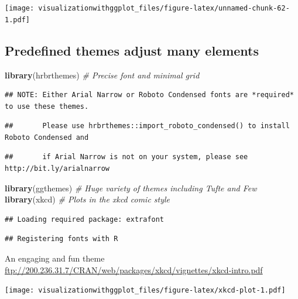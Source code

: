 \documentclass[]{krantz}
\makeatletter
\newenvironment{Shaded}{\begin{snugshade}}{\end{snugshade}}
\newcommand{\KeywordTok}[1]{\textcolor[rgb]{0.13,0.29,0.53}{\textbf{#1}}}
\newcommand{\CommentTok}[1]{\textcolor[rgb]{0.56,0.35,0.01}{\textit{#1}}}
\newcommand{\NormalTok}[1]{#1}
\newenvironment{kframe}{%
\medskip{}
\setlength{\fboxsep}{.8em}
 \def\at@end@of@kframe{}%
 \ifinner\ifhmode%
  \def\at@end@of@kframe{\end{minipage}}%
  \begin{minipage}{\columnwidth}%
 \fi\fi%
 \def\FrameCommand##1{\hskip\@totalleftmargin \hskip-\fboxsep
 \colorbox{shadecolor}{##1}\hskip-\fboxsep
     \hskip-\linewidth \hskip-\@totalleftmargin \hskip\columnwidth}%
 \MakeFramed {\advance\hsize-\width
   \@totalleftmargin\z@ \linewidth\hsize
   \@setminipage}}%
 {\par\unskip\endMakeFramed%
 \at@end@of@kframe}
\renewenvironment{Shaded}{\begin{kframe}}{\end{kframe}}
\theoremstyle{definition}
\theoremstyle{definition}
\theoremstyle{definition}
\theoremstyle{remark}
\makeatother
\begin{document}
\texttt{[image: visualizationwithggplot\_files/figure-latex/unnamed-chunk-62-1.pdf]}

\subsection{Predefined themes adjust many
elements}\label{predefined-themes-adjust-many-elements}

\begin{Shaded}
\begin{Highlighting}[]
\KeywordTok{library}\NormalTok{(hrbrthemes) }\CommentTok{# Precise font and minimal grid}
\end{Highlighting}
\end{Shaded}

\begin{verbatim}
## NOTE: Either Arial Narrow or Roboto Condensed fonts are *required* to use these themes.
\end{verbatim}

\begin{verbatim}
##       Please use hrbrthemes::import_roboto_condensed() to install Roboto Condensed and
\end{verbatim}

\begin{verbatim}
##       if Arial Narrow is not on your system, please see http://bit.ly/arialnarrow
\end{verbatim}

\begin{Shaded}
\begin{Highlighting}[]
\KeywordTok{library}\NormalTok{(ggthemes) }\CommentTok{# Huge variety of themes including Tufte and Few}
\KeywordTok{library}\NormalTok{(xkcd) }\CommentTok{# Plots in the xkcd comic style}
\end{Highlighting}
\end{Shaded}

\begin{verbatim}
## Loading required package: extrafont
\end{verbatim}

\begin{verbatim}
## Registering fonts with R
\end{verbatim}

An engaging and fun theme
\url{ftp://200.236.31.7/CRAN/web/packages/xkcd/vignettes/xkcd-intro.pdf}

\texttt{[image: visualizationwithggplot\_files/figure-latex/xkcd-plot-1.pdf]}
\end{document}
